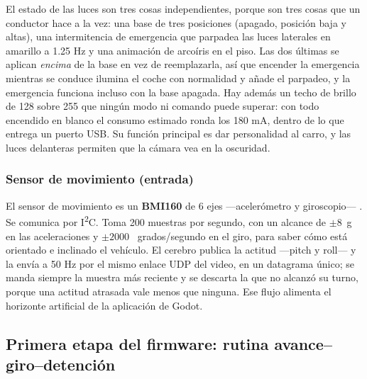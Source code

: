 \documentclass[journal]{IEEEtran}
\begin{document}
El estado de las luces son tres cosas independientes, porque son tres cosas que un conductor hace a la vez: una base de tres posiciones (apagado, posición baja y altas), una intermitencia de emergencia que parpadea las luces laterales en amarillo a 1.25 Hz y una animación de arcoíris en el piso. Las dos últimas se aplican \emph{encima} de la base en vez de reemplazarla, así que encender la emergencia mientras se conduce ilumina el coche con normalidad y añade el parpadeo, y la emergencia funciona incluso con la base apagada. Hay además un techo de brillo de 128 sobre 255 que ningún modo ni comando puede superar: con todo encendido en blanco el consumo estimado ronda los 180 mA, dentro de lo que entrega un puerto USB. Su función principal es dar personalidad al carro, y las luces delanteras permiten que la cámara vea en la oscuridad.

\subsubsection{Sensor de movimiento (entrada)}
El sensor de movimiento es un \textbf{BMI160} de 6 ejes ---acelerómetro y giroscopio--- \cite{bmi160}. Se comunica por I\textsuperscript{2}C. Toma 200 muestras por segundo, con un alcance de $\pm 8$~g en las aceleraciones y $\pm 2000$~ grados/segundo en el giro, para saber cómo está orientado e inclinado el vehículo. El cerebro publica la actitud ---pitch y roll--- y la envía a 50 Hz por el mismo enlace UDP del video, en un datagrama único; se manda siempre la muestra más reciente y se descarta la que no alcanzó su turno, porque una actitud atrasada vale menos que ninguna. Ese flujo alimenta el horizonte artificial de la aplicación de Godot.

\subsection{Primera etapa del firmware: rutina avance--giro--detención}
\end{document}
